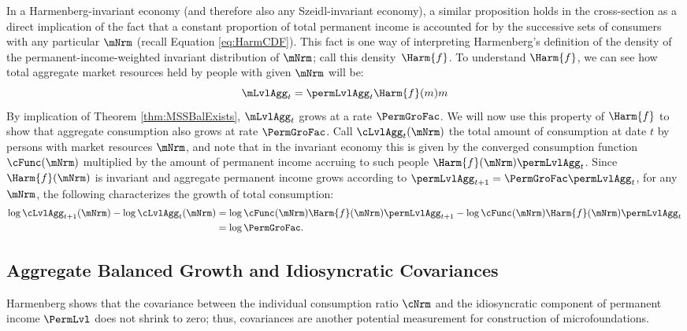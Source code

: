 \documentclass[BufferStockTheory]{subfiles}
\begin{document}
In a Harmenberg-invariant economy (and therefore also any Szeidl-invariant economy), a similar proposition holds in the cross-section as a direct implication of the fact that a constant proportion of total permanent income is accounted for by the successive sets of consumers with any particular $\mNrm$ (recall Equation \eqref{eq:HarmCDF}). This fact is one way of interpreting Harmenberg's definition of the density of the permanent-income-weighted invariant distribution of $\mNrm$; call this density~$\Harm{f}$. To understand $\Harm{f}$, we can see how total aggregate market resources held by people with given $\mNrm$ will be:
%
%
\begin{equation}
\mLvlAgg_{t}=\permLvlAgg_{t}\Harm{f}(m)m
\end{equation}
%
%
By implication of Theorem \ref{thm:MSSBalExists}, $\mLvlAgg_{t}$ grows at a rate $\PermGroFac$. We will now use this property of $\Harm{f}$ to show that aggregate consumption also grows at rate $\PermGroFac$. Call $\cLvlAgg_{t}(\mNrm)$ the total amount of consumption at date $t$ by persons with market resources $\mNrm$, and note that in the invariant economy this is given by the converged consumption function $\cFunc(\mNrm)$ multiplied by the amount of permanent income accruing to such people $\Harm{f}(\mNrm)\permLvlAgg_{t}$.  Since $\Harm{f}(\mNrm)$ is invariant and aggregate permanent income grows according to $\permLvlAgg_{t+1} = \PermGroFac \permLvlAgg_{t}$, for any $\mNrm$, the following characterizes the growth of total consumption:
%
%
\begin{equation*}
  \begin{split}
    \log \cLvlAgg_{t+1}(\mNrm) - \log \cLvlAgg_{t}(\mNrm) &  \notag
    = \log \cFunc(\mNrm) \Harm{f}(\mNrm)\permLvlAgg_{t+1} - \log \cFunc(\mNrm)\Harm{f}(\mNrm)\permLvlAgg_{t} \\
    & = \log \PermGroFac.
  \end{split}
\end{equation*}



\hypertarget{Balanced-Growth-Of-Covariances}{}
\subsection{Aggregate Balanced Growth and Idiosyncratic Covariances}\label{subsec:Covariances}

Harmenberg shows that the covariance between the individual consumption ratio $\cNrm$ and the idiosyncratic component of permanent income $\PermLvl$ does not shrink to zero; thus, covariances are another potential measurement for construction of microfoundations.  %
\end{document}
